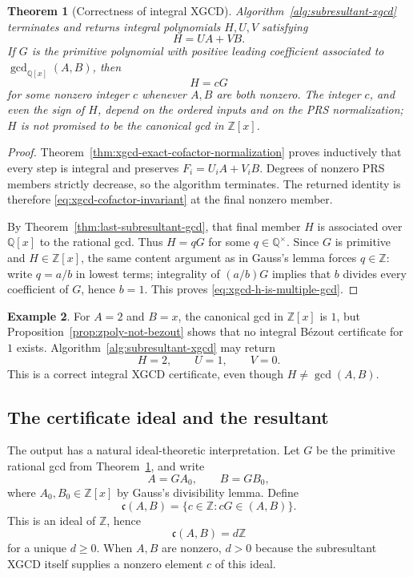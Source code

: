 \documentclass[11pt]{book}
\newtheorem{theorem}{Theorem}[section]
\theoremstyle{definition}
\newtheorem{example}[theorem]{Example}
\newcommand{\ZZ}{\mathbb Z}
\begin{document}
\begin{theorem}[Correctness of integral XGCD]
\label{thm:subresultant-xgcd-correct}
Algorithm~\ref{alg:subresultant-xgcd} terminates and returns integral
polynomials $H,U,V$ satisfying
\[
 H=UA+VB.
\]
If $G$ is the primitive polynomial with positive leading coefficient
associated to $\gcd_{\mathbb Q[x]}(A,B)$, then
\begin{equation}\label{eq:xgcd-h-is-multiple-gcd}
 H=cG
\end{equation}
for some nonzero integer $c$ whenever $A,B$ are both nonzero.
The integer $c$, and even the sign of $H$, depend on the ordered inputs and on
the PRS normalization; $H$ is not promised to be the canonical gcd in
$\ZZ[x]$.
\end{theorem}

\begin{proof}
Theorem~\ref{thm:xgcd-exact-cofactor-normalization} proves inductively that
every step is integral and preserves
$F_i=U_iA+V_iB$.  Degrees of nonzero PRS members strictly decrease, so the
algorithm terminates.  The returned identity is therefore
\eqref{eq:xgcd-cofactor-invariant} at the final nonzero member.

By Theorem~\ref{thm:last-subresultant-gcd}, that final member $H$ is associated
over $\mathbb Q[x]$ to the rational gcd.  Thus $H=qG$ for some
$q\in\mathbb Q^\times$.  Since $G$ is primitive and $H\in\ZZ[x]$, the same
content argument as in Gauss's lemma forces $q\in\ZZ$: write $q=a/b$ in
lowest terms; integrality of $(a/b)G$ implies that $b$ divides every
coefficient of $G$, hence $b=1$.  This proves
\eqref{eq:xgcd-h-is-multiple-gcd}.
\end{proof}

\begin{example}
For $A=2$ and $B=x$, the canonical gcd in $\ZZ[x]$ is $1$, but
Proposition~\ref{prop:zpoly-not-bezout} shows that no integral B\'ezout
certificate for $1$ exists.  Algorithm~\ref{alg:subresultant-xgcd} may return
\[
 H=2,
 \qquad U=1,
 \qquad V=0.
\]
This is a correct integral XGCD certificate, even though $H\ne\gcd(A,B)$.
\end{example}

\subsection{The certificate ideal and the resultant}

The output has a natural ideal-theoretic interpretation.  Let $G$ be the
primitive rational gcd from Theorem~\ref{thm:subresultant-xgcd-correct}, and
write
\[
 A=GA_0,
 \qquad
 B=GB_0,
\]
where $A_0,B_0\in\ZZ[x]$ by Gauss's divisibility lemma.  Define
\begin{equation}\label{eq:xgcd-certificate-ideal}
 \mathfrak c(A,B)
 =\{c\in\ZZ:cG\in(A,B)\}.
\end{equation}
This is an ideal of $\ZZ$, hence
\[
 \mathfrak c(A,B)=d\ZZ
\]
for a unique $d\ge0$.  When $A,B$ are nonzero, $d>0$ because the
subresultant XGCD itself supplies a nonzero element $c$ of this ideal.
\end{document}
